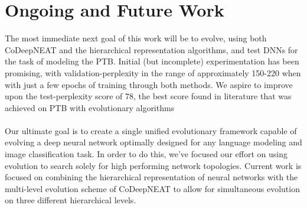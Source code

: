 \documentclass[11pt]{article}
\begin{document}
\section{Ongoing and Future Work}
The most immediate next goal of this work will be to evolve, using both CoDeepNEAT and the hierarchical representation algorithms, and test DNNs for the task of modeling the PTB. Initial (but incomplete) experimentation has been promising, with validation-perplexity in the range of approximately 150-220 when with just a few epochs of training through both methods. We aspire to improve upon the test-perplexity score of 78, the best score found in literature that was achieved on PTB with evolutionary algorithms \cite{codeepneat} \\ \\ Our ultimate goal is to create a single unified evolutionary framework capable of evolving a deep neural network optimally designed for any language modeling and image classification task. In order to do this, we've focused our effort on using evolution to search solely for high performing network topologies. Current work is focused on combining the hierarchical representation of neural networks with the multi-level evolution scheme of CoDeepNEAT to allow for simultaneous evolution on three different hierarchical levels. 




\end{document}
